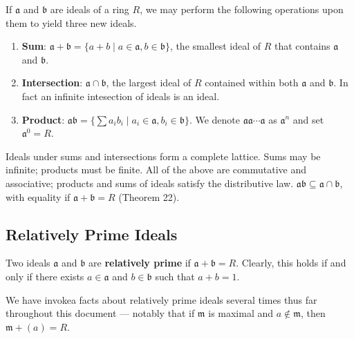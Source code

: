 \documentclass[11pt]{article}
\begin{document}
If $\mathfrak{a}$ and $\mathfrak{b}$ are ideals of a ring $R$, we may perform the following operations upon them to yield three new ideals.
\begin{enumerate}
	\item \textbf{Sum}: $\mathfrak{a} + \mathfrak{b} = \{ a + b \mid a \in \mathfrak{a}, b \in \mathfrak{b} \}$, the smallest ideal of $R$ that contains $\mathfrak{a}$ and $\mathfrak{b}$.
	\item \textbf{Intersection}: $\mathfrak{a} \cap \mathfrak{b}$, the largest ideal of $R$ contained within both $\mathfrak{a}$ and $\mathfrak{b}$. In fact an infinite intesection of ideals is an ideal.
	\item \textbf{Product}: $\mathfrak{a} \mathfrak{b} = \{ \sum\limits a_{i}b_{i} \mid a_{i} \in \mathfrak{a}, b_{i} \in \mathfrak{b} \}$. We denote $\mathfrak{a} \mathfrak{a} \cdots \mathfrak{a}$ as $\mathfrak{a}^{n}$ and set $\mathfrak{a}^{0} = R$.
\end{enumerate}

Ideals under sums and intersections form a complete lattice. Sums may be infinite; products must be finite. All of the above are commutative and associative; products and sums of ideals satisfy the distributive law. $\mathfrak{a}\mathfrak{b} \subseteq \mathfrak{a} \cap \mathfrak{b}$, with equality if $\mathfrak{a} + \mathfrak{b} = R$ (Theorem 22).


\subsection{Relatively Prime Ideals}

Two ideals $\mathfrak{a}$ and $\mathfrak{b}$ are \textbf{relatively prime} if $\mathfrak{a} + \mathfrak{b} = R$. Clearly, this holds if and only if there exists $a \in \mathfrak{a}$ and $b \in \mathfrak{b}$ such that $a + b = 1$. 

We have invokea facts about relatively prime ideals several times thus far throughout this document --- notably that if $\mathfrak{m}$ is maximal and $a \notin \mathfrak{m}$, then $\mathfrak{m} + (a) = R$.

\newpage
\end{document}
